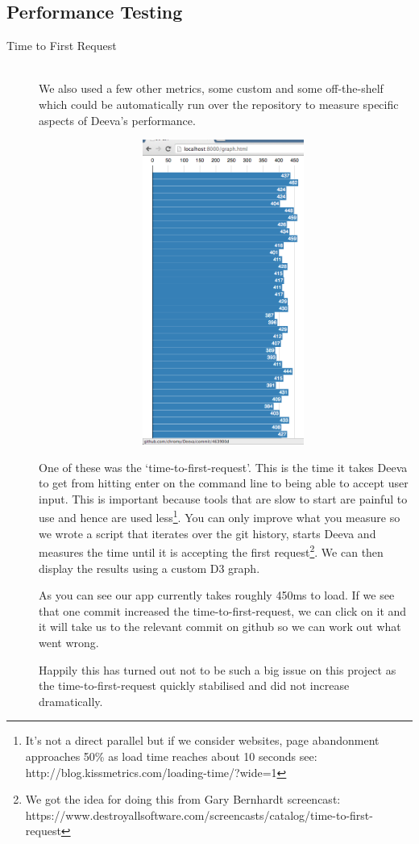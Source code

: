 \documentclass[11pt, a4paper]{article}
\begin{document}
\subsection{Performance Testing}
\begin{description}
\item[Time to First Request] \hfill \\
We also used a few other metrics, some custom and some off-the-shelf which could be automatically run over the repository to measure specific aspects of Deeva’s performance.
\begin{figure}[h!]
\centering
\includegraphics[height=100mm,width=100mm]{timeToFirstRequest.png}
\end{figure}

One of these was the ‘time-to-first-request’.
This is the time it takes Deeva to get from hitting enter on the command line to being able to accept user input.
This is important because tools that are slow to start are painful to use and hence are used less\footnote{ It’s not a direct parallel but if we consider websites, page abandonment approaches 50\% as load time reaches about 10 seconds see: http://blog.kissmetrics.com/loading-time/?wide=1}.
You can only improve what you measure so we wrote a script that iterates over the git history, starts Deeva and measures the time until it is accepting the first request\footnote{We got the idea for doing this from Gary Bernhardt screencast: https://www.destroyallsoftware.com/screencasts/catalog/time-to-first-request}.
We can then display the results using a custom D3 graph.

As you can see our app currently takes roughly 450ms to load.
If we see that one commit increased the time-to-first-request, we can click on it and it will take us to the relevant commit on github so we can work out what went wrong.

Happily this has turned out not to be such a big issue on this project as the time-to-first-request quickly stabilised and did not increase dramatically. 

\end{description}
\end{document}
